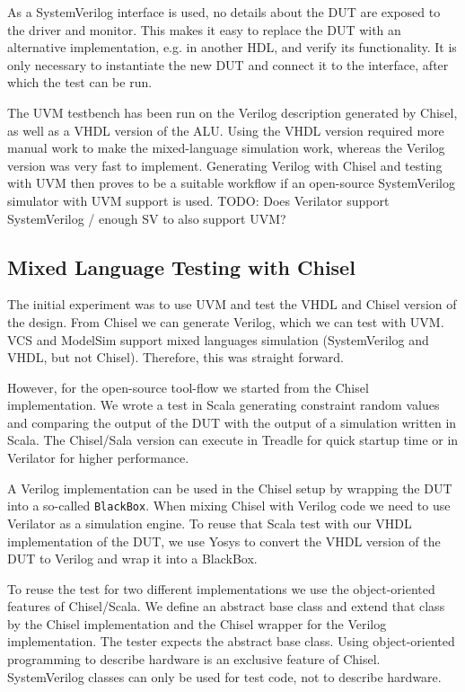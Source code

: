 \documentclass[conference]{IEEEtran}
\newcommand{\code}[1]{{\small{\texttt{#1}}}}
\newcommand{\todo}[1]{{\color{olive} TODO: #1}}
\begin{document}
As a SystemVerilog interface is used, no details about the DUT are exposed to the driver and monitor. This makes it easy to replace the DUT with an alternative implementation, e.g. in another HDL, and verify its functionality. It is only necessary to instantiate the new DUT and connect it to the interface, after which the test can be run.

The UVM testbench has been run on the Verilog description generated by Chisel, as well as a VHDL version of the ALU. Using the VHDL version required more manual work to make the mixed-language simulation work, whereas the Verilog version was very fast to implement. Generating Verilog with Chisel and testing with UVM then proves to be a suitable workflow if an open-source SystemVerilog simulator with UVM support is used. \todo{Does Verilator support SystemVerilog / enough SV to also support UVM?}


\subsection{Mixed Language Testing with Chisel}


The initial experiment was to use UVM and test the VHDL and Chisel version of the
design. From Chisel we can generate Verilog, which we can test with UVM.
VCS and ModelSim support mixed languages simulation (SystemVerilog and VHDL,
but not Chisel). Therefore, this was straight forward.

However, for the open-source tool-flow we started from the Chisel implementation.
We wrote a test in Scala generating constraint random values and comparing the output
of the DUT with the output of a simulation written in Scala.
The Chisel/Sala version can execute in Treadle for  quick startup time or in Verilator
for higher performance.

A Verilog implementation can be used in the Chisel setup by wrapping the DUT
into a so-called \code{BlackBox}. When mixing Chisel with Verilog code we need
to use Verilator as a simulation engine.
To reuse that Scala test with our VHDL implementation of the DUT, we use Yosys
to convert the VHDL version of the DUT to Verilog and wrap it into a BlackBox.

To reuse the test for two different implementations we use the object-oriented features
of Chisel/Scala. We define an abstract base class and extend that class by the Chisel
implementation and the Chisel wrapper for the Verilog implementation.
The tester expects the abstract base class.
Using object-oriented programming to describe hardware is an exclusive
feature of Chisel. SystemVerilog classes can only be used for test code,
not to describe hardware.
\end{document}
